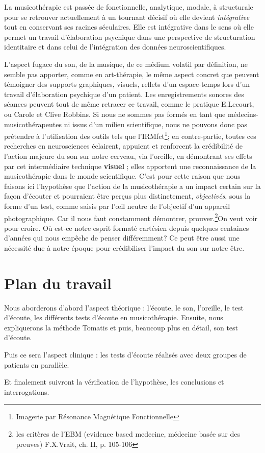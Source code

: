  La musicothérapie est passée de fonctionnelle, analytique, mo\-da\-le,  à 
struc\-tu\-rale pour se retrouver actuellement 
 à un tournant décisif où elle devient 
 \emph{intégrative} tout en conservant ses racines séculaires. Elle est 
intégrative dans le sens où elle permet un travail d'élaboration psychique dans 
une perspective de structuration identitaire \autocite[ch. III, p. 53, 
105]{vrait_musicotherapie_2018} et dans celui de l'intégration des données 
neuroscientifiques.
 
  
L'aspect fugace du son, de la musique, de ce médium volatil par
définition, ne semble pas apporter, comme en art-thérapie, le
même aspect concret que peuvent témoigner des supports graphiques,
visuels, reflets d'un espace-temps lors d'un travail d'élaboration
psychique d'un patient. Les enregistrements sonores des séances peuvent tout de 
même retracer ce travail, comme le pratique E.Lecourt, ou Carole et Clive 
Robbins.
Si nous ne sommes pas formés en tant que médecins- musicothérapeutes ni issus 
d'un milieu scientifique, nous ne pouvons donc  pas prétendre à l'utilisation 
des outils
 tels que l'IRMfct\footnote{Imagerie par Résonance Magnétique Fonctionnelle}; 
en contre-partie, toutes ces recherches en
neurosciences éclairent, appuient et renforcent la crédibilité de l'action
majeure du son sur notre cerveau, via l'oreille, en démontrant ses effets par 
cet intermédiaire technique \textbf{visuel} ; elles apportent une 
reconnaissance de la musicothérapie dans le monde scientifique. C'est pour 
cette raison que nous  faisons ici l'hypothèse que l'action de la 
musicothérapie a un impact certain sur la façon d'écouter et pourraient être 
perçus plus
distinctement, \textsl{objectivés}, sous la forme d'un test, comme saisis par 
l'\oe il neutre de l'objectif d'un appareil
photographique.
Car il nous faut constamment démontrer, prouver.\footnote{
	les critères de l'EBM (evidence based medecine, médecine basée sur des 
preuves) F.X.Vrait, ch. II, p. 105-106 }On veut voir pour croire. Où est-ce 
notre esprit formaté cartésien depuis quelques centaines d'années qui nous 
empêche de penser différemment? 
Ce peut être aussi une nécessité due à notre époque pour crédibiliser l'impact 
du son sur notre être. 


\section{Plan du travail}

Nous aborderons d'abord l'aspect théorique : l'écoute, le son, l'oreille, le 
test d'écoute, les différents tests d'écoute en musicothérapie.  Ensuite, nous 
expliquerons  la méthode Tomatis
et puis, beaucoup plus en détail, son test d'écoute.

Puis ce sera l'aspect clinique : les tests d'écoute réalisés  avec deux groupes 
de patients en parallèle.

Et finalement suivront la vérification de l'hypothèse, les conclusions et 
interrogations. 
